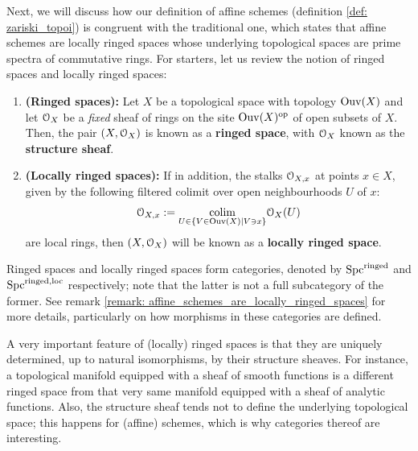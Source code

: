                 Next, we will discuss how our definition of affine schemes (definition \ref{def: zariski_topoi}) is congruent with the traditional one, which states that affine schemes are locally ringed spaces whose underlying topological spaces are prime spectra of commutative rings. For starters, let us review the notion of ringed spaces and locally ringed spaces:
                \begin{definition} \label{def: ringed_spaces}
                    \noindent
                    \begin{enumerate}
                        \item \textbf{(Ringed spaces):} Let $X$ be a topological space with topology $\mathrm{Ouv}(X)$ and let $\mathcal{O}_X$ be a \textit{fixed} sheaf of rings on the site $\mathrm{Ouv}(X)^{\mathrm{op}}$ of open subsets of $X$. Then, the pair $(X, \mathcal{O}_X)$ is known as a \textbf{ringed space}, with $\mathcal{O}_X$ known as the \textbf{structure sheaf}.
                        \item \textbf{(Locally ringed spaces):} If in addition, the stalks $\mathcal{O}_{X, x}$ at points $x \in X$, given by the following filtered colimit over open neighbourhoods $U$ of $x$:
                            $$\mathcal{O}_{X, x} := \underset{U \in \{V \in \mathrm{Ouv}(X) \mid V \ni x\}}{\operatorname{colim}} \mathcal{O}_X(U)$$
                        are local rings, then $(X, \mathcal{O}_X)$ will be known as a \textbf{locally ringed space}.
                    \end{enumerate}
                \end{definition}
                \begin{remark} \label{remark: cateogry_of_ringed_spaces}
                    Ringed spaces and locally ringed spaces form categories, denoted by $\mathrm{Spc}^{\mathrm{ringed}}$ and $\mathrm{Spc}^{\mathrm{ringed}, \mathrm{loc}}$ respectively; note that the latter is not a full subcategory of the former. See remark \ref{remark: affine_schemes_are_locally_ringed_spaces} for more details, particularly on how morphisms in these categories are defined.
                \end{remark}
                \begin{example}
                    A very important feature of (locally) ringed spaces is that they are uniquely determined, up to natural isomorphisms, by their structure sheaves. For instance, a topological manifold equipped with a sheaf of smooth functions is a different ringed space from that very same manifold equipped with a sheaf of analytic functions. Also, the structure sheaf tends not to define the underlying topological space; this happens for (affine) schemes, which is why categories thereof are interesting.
                \end{example}
                
